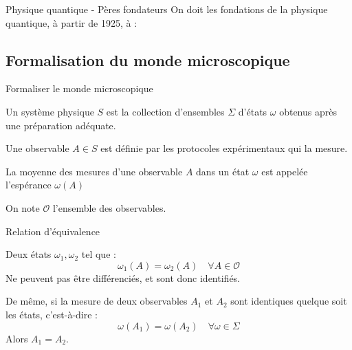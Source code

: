 \documentclass[11pt, xcolor=table]{beamer}
\begin{document}
\begin{frame}{Physique quantique - Pères fondateurs}
    On doit les fondations de la physique quantique, à partir de 1925, à :


\end{frame}

\subsection{Formalisation du monde microscopique}

\begin{frame}{Formaliser le monde microscopique}
    \begin{mydef}
        Un système physique $S$ est la collection d'ensembles $\Sigma$ d'états $\omega$ obtenus après une préparation adéquate.

        Une observable $A \in S$ est définie par les protocoles expérimentaux qui la mesure.

        La moyenne des mesures d'une observable $A$ dans un état $\omega$ est appelée l'espérance $\omega(A)$

        On note $\mathcal{O}$ l'ensemble des observables.
    \end{mydef}
\end{frame}

\begin{frame}{Relation d'équivalence}
    \begin{myth}
        Deux états $\omega_1, \omega_2$ tel que :
        \[
            \omega_1 ( A) = \omega_2(A) \quad \forall A \in \mathcal{O}
        \]
        Ne peuvent pas être différenciés, et sont donc identifiés.
        
        De même, si la mesure de deux observables $A_1$ et $A_2$ sont identiques quelque soit les états, c'est-à-dire :
        \[
            \omega(A_1) = \omega(A_2) \quad \forall \omega \in \Sigma
        \]
        Alors $A_1 = A_2$.
    \end{myth}
\end{frame}
\end{document}

